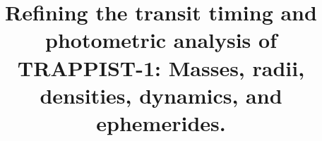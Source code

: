 \documentclass[twocolumn]{aastex63}
\begin{document}
\title{Refining the transit timing and photometric 
analysis of TRAPPIST-1: Masses, radii, densities, dynamics, and ephemerides.}


\end{document}
